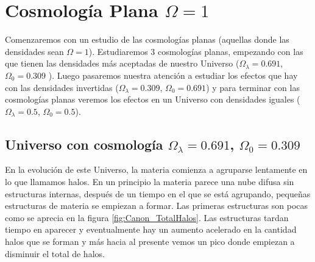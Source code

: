 \section[Cosmología Plana \texorpdfstring{$\Omega = 1$}{Omega = 1}]{Cosmología Plana \texorpdfstring{$\Omega = 1$}{Omega = 1}}

\noindent Comenzaremos con un estudio de las cosmologías planas (aquellas donde las densidades sean $\Omega = 1$). Estudiaremos 3 cosmologías planas, empezando con las que tienen las densidades más aceptadas de nuestro Universo ($\Omega_\lambda = 0.691$, $\Omega_0 = 0.309$  \cite{2020A&A...641A...1P}). Luego pasaremos nuestra atención a estudiar los efectos que hay con las densidades invertidas ($\Omega_\lambda = 0.309$, $\Omega_0 = 0.691$) y para terminar con las cosmologías planas veremos los efectos en un Universo con densidades iguales ($\Omega_\lambda = 0.5$, $\Omega_0 = 0.5$).

\subsection{Universo con cosmología  \texorpdfstring{$\Omega_\lambda = 0.691$, $\Omega_0 = 0.309$ }{Omega lambda = 0.691, Omega 0 = 0.309}  }

 En la evolución de este Universo, la materia comienza a agruparse lentamente en lo que llamamos halos. En un principio la materia parece una nube difusa sin estructuras internas, después de un tiempo en el que se está {\morado agrupando}, pequeñas estructuras de materia se empiezan a formar. Las primeras estructuras son pocas como se aprecia en la figura \ref{fig:Canon_TotalHalos}. Las estructuras tardan tiempo en aparecer y eventualmente hay un aumento acelerado en la cantidad halos que se forman y más hacia al presente vemos un pico donde empiezan a disminuir el total de halos.

